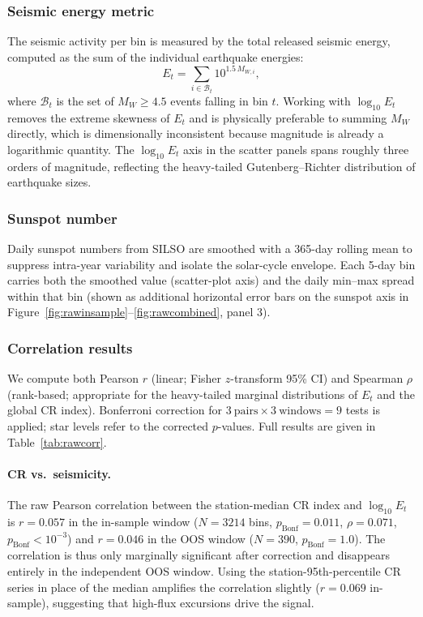 \documentclass[12pt,a4paper]{article}
\begin{document}
\subsubsection{Seismic energy metric}

The seismic activity per bin is measured by the total released seismic energy,
computed as the sum of the individual earthquake energies:
\begin{equation}
  E_t = \sum_{i \in \mathcal{B}_t} 10^{1.5\, M_{W,i}},
  \label{eq:energy_bin}
\end{equation}
where $\mathcal{B}_t$ is the set of $M_W \geq 4.5$ events falling in bin $t$.
Working with $\log_{10} E_t$ removes the extreme skewness of $E_t$ and is
physically preferable to summing $M_W$ directly, which is dimensionally
inconsistent because magnitude is already a logarithmic quantity.
The $\log_{10} E_t$ axis in the scatter panels spans roughly three orders of
magnitude, reflecting the heavy-tailed Gutenberg--Richter distribution of
earthquake sizes.

\subsubsection{Sunspot number}

Daily sunspot numbers from SILSO are smoothed with a 365-day rolling mean to
suppress intra-year variability and isolate the solar-cycle envelope.
Each 5-day bin carries both the smoothed value (scatter-plot axis) and the
daily min--max spread within that bin (shown as additional horizontal error
bars on the sunspot axis in Figure~\ref{fig:rawinsample}--\ref{fig:rawcombined},
panel 3).

\subsubsection{Correlation results}

We compute both Pearson $r$ (linear; Fisher $z$-transform 95\% CI) and
Spearman $\rho$ (rank-based; appropriate for the heavy-tailed marginal
distributions of $E_t$ and the global CR index).
Bonferroni correction for $3\ \text{pairs} \times 3\ \text{windows} = 9$
tests is applied; star levels refer to the corrected $p$-values.
Full results are given in Table~\ref{tab:rawcorr}.

\paragraph{CR vs.\ seismicity.}
The raw Pearson correlation between the station-median CR index and
$\log_{10} E_t$ is $r = 0.057$ in the in-sample window ($N = 3214$ bins,
$p_\text{Bonf} = 0.011$, $\rho = 0.071$, $p_\text{Bonf} < 10^{-3}$) and
$r = 0.046$ in the OOS window ($N = 390$, $p_\text{Bonf} = 1.0$).
The correlation is thus only marginally significant after correction and
disappears entirely in the independent OOS window.
Using the station-95th-percentile CR series in place of the median
amplifies the correlation slightly ($r = 0.069$ in-sample), suggesting that
high-flux excursions drive the signal.
\end{document}
